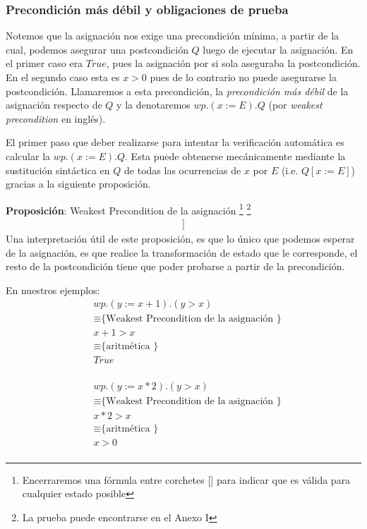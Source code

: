\documentclass[12pt, a4paper, openany, fleqn]{book}
\begin{document}
    \subsubsection*{Precondición más débil y obligaciones de prueba}
    Notemos que la asignación nos exige una precondición mínima, a partir de la cual, podemos asegurar una postcondición $Q$ luego de ejecutar la asignación. En el primer caso era $True$, pues la asignación por si sola aseguraba la postcondición. En el segundo caso esta es $x > 0$ pues de lo contrario no puede asegurarse la postcondición.
    Llamaremos a esta precondición, la \textit{precondición más débil} de la asignación respecto de $Q$ y la denotaremos $wp.(x := E).Q$ (por \textit{weakest precondition} en inglés).

    El primer paso que deber realizarse para intentar la verificación automática es calcular la $wp.(x := E).Q$.
    Esta puede obtenerse mecánicamente mediante la sustitución sintáctica en $Q$ de todas las ocurrencias de $x$ por $E$ (i.e. $Q[x := E]$) gracias a la siguiente proposición.

    \textbf{Proposición}: Weakest Precondition de la asignación
    \footnote{Encerraremos una fórmula entre corchetes [] para indicar que es válida para cualquier estado posible}
    \footnote{La prueba puede encontrarse en el Anexo I}
    \begin{align*}
        [ wp.(x:=E).Q \equiv Q[x:=E] ]
    \end{align*}
    Una interpretación útil de este proposición, es que lo único que podemos esperar de la asignación, es que realice la transformación de estado que le corresponde, el resto de la postcondición tiene que poder probarse a partir de la precondición.

    En nuestros ejemplos:
    \begin{align*}
        & wp.(y := x + 1).( y > x )\\
        & \equiv \text{\{ Weakest Precondition de la asignación \}}\\
        & x + 1 > x\\
        & \equiv \text{\{ aritmética \}}\\
        & True\\
    \end{align*}

    \begin{align*}
        & wp.(y := x * 2).( y > x )\\
        & \equiv \text{\{ Weakest Precondition de la asignación \}}\\
        & x * 2 > x\\
        & \equiv \text{\{ aritmética \}}\\
        & x > 0\\
    \end{align*}
\end{document}
